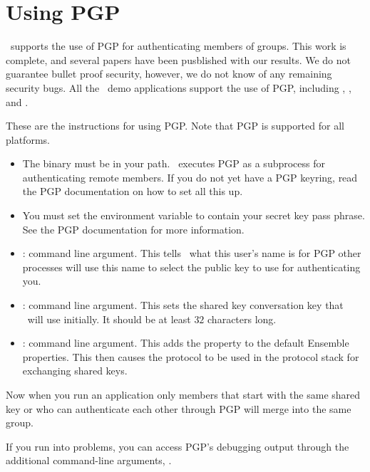 %
%
%
\section{Using PGP}

\ensemble\ supports the use of PGP for authenticating members of
groups.  This work is complete, and several papers have been
pusblished with our results. We do not guarantee bullet proof
security, however, we do not know of any remaining security bugs.
All the \ensemble\ demo
applications support the use of PGP, including ,
, and .

These are the instructions for using PGP. Note that PGP is 
supported for all platforms.

\begin{itemize}
\item
The  binary must be in your path.  \ensemble\ executes PGP
as a subprocess for authenticating remote members.  If you do not yet
have a PGP keyring, read the PGP documentation on how to set all this
up.
\item
You must set the  environment variable to contain your
secret key pass phrase.  See the PGP documentation for more
information.
\item
{} : command line argument.  This tells \ensemble\ what
this user's name is for PGP other processes will use this name to
select the public key to use for authenticating you.
\item
{}: command line argument.  This sets the shared
key conversation key that \ensemble\ will use initially.  It should
be at least $32$ characters long.
\item
{}: command line argument.  This adds the
 property to the default Ensemble properties.  This then
causes the  protocol to be used in the protocol stack
for exchanging shared keys.
\end{itemize}

Now when you run an application only members that start with the same
shared key or who can authenticate each other through PGP will
merge into the same group.

If you run into problems, you can access PGP's debugging output
through the additional command-line arguments, .

